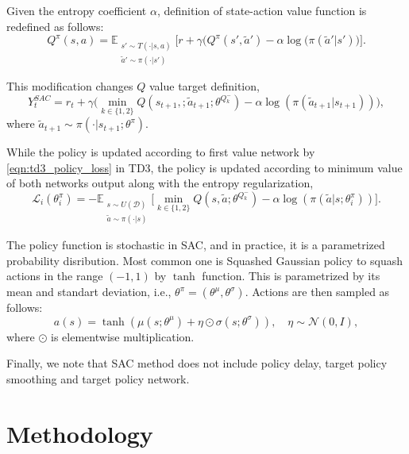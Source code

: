 \documentclass[a4paper, 12pt]{article} %
\begin{document}
Given the entropy coefficient $\alpha$, definition of state-action value function is redefined as follows: 
\begin{equation}
\label{eqn:q_dfn_entreg}
Q^{\pi}(s,a) = \mathbb{E}_{\substack{s'\sim T(\cdot|s,a)\\\widetilde{a}'\sim \pi(\cdot|s')} } \Big[r + \gamma \Big(Q^{\pi}(s',\widetilde{a}') -\alpha\log(\pi(\widetilde{a}'|s') \Big) \Big]. %
\end{equation}

This modification changes $Q$ value target definition,
\begin{equation}
\label{eqn:q_target_sac}
Y_t^{SAC} = r_t + \gamma \Big(\min_{k\in\{1,2\}} Q(s_{t+1}, ;\widetilde{a}_{t+1};\theta^{Q_k^-}) -\alpha\log(\pi(\widetilde{a}_{t+1}|s_{t+1})) \Big),
\end{equation}
where $\widetilde{a}_{t+1} \sim \pi(\cdot|s_{t+1}; \theta^{\pi})$.

While the policy is updated according to first value network by \eqref{eqn:td3_policy_loss} in TD3, the policy is updated according to minimum value of both networks output along with the entropy regularization, 
\begin{equation}
\label{eqn:sac_policy_loss}
\mathcal{L}_i(\theta^\pi_i) = - \mathbb{E}_{\substack{s \sim U(\mathcal{D})\\\widetilde{a} \sim \pi(\cdot|s)}} \Big[ \min_{k\in\{1,2\}} Q(s, \widetilde{a};\theta^{Q_k^-}) - \alpha\log(\pi(\widetilde{a}|s;\theta^\pi_i)) \Big].
\end{equation}

The policy function is stochastic in SAC, and in practice, it is a parametrized probability disribution. Most common one is 
Squashed Gaussian policy to squash actions in the range $(-1,1)$ by $\tanh$ function. 
This is parametrized by its mean and standart deviation, i.e., $\theta^{\pi}=(\theta^{\mu}, \theta^{\sigma})$. Actions are then sampled as follows: 
\begin{equation}
\label{eqn:squashed_gp_sampling}
a(s) = \tanh(\mu(s; \theta^{\mu}) + \eta \odot \sigma(s; \theta^{\sigma})), \quad \eta \sim \mathcal{N}(0, I), 
\end{equation}
where $\odot$ is elementwise multiplication.

Finally, we note that SAC method does not include policy delay, target policy smoothing and target policy network. 

\section{Methodology}
\end{document}
